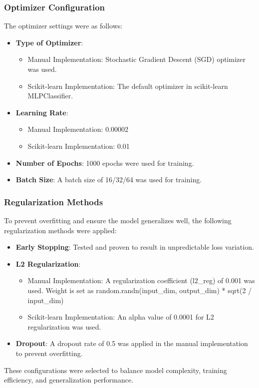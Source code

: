\documentclass[a4paper,12pt]{article}
\begin{document}
\subsubsection{Optimizer Configuration}
The optimizer settings were as follows:
\begin{itemize}
    \item \textbf{Type of Optimizer}:
    \begin{itemize}
        \item Manual Implementation: Stochastic Gradient Descent (SGD) optimizer was used.
        \item Scikit-learn Implementation: The default optimizer in scikit-learn MLPClassifier.
    \end{itemize}
    \item \textbf{Learning Rate}:
    \begin{itemize}
        \item Manual Implementation: 0.00002
        \item Scikit-learn Implementation: 0.01
    \end{itemize}
    \item \textbf{Number of Epochs}: 1000 epochs were used for training.
    \item \textbf{Batch Size}: A batch size of 16/32/64 was used for training.
\end{itemize}

\subsubsection{Regularization Methods}
To prevent overfitting and ensure the model generalizes well, the following regularization methods were applied:
\begin{itemize}
    \item \textbf{Early Stopping}: Tested and proven to result in unpredictable loss variation.
    \item \textbf{L2 Regularization}:
    \begin{itemize}
        \item Manual Implementation: A regularization coefficient (l2\_reg) of 0.001 was used. 
        Weight is set as random.randn(input\_dim, output\_dim) * sqrt(2 / input\_dim)
        \item Scikit-learn Implementation: An alpha value of 0.0001 for L2 regularization was used.
    \end{itemize}
    \item \textbf{Dropout}: A dropout rate of 0.5 was applied in the manual implementation to prevent overfitting.
\end{itemize}

These configurations were selected to balance model complexity, training efficiency, and generalization performance.
\end{document}
